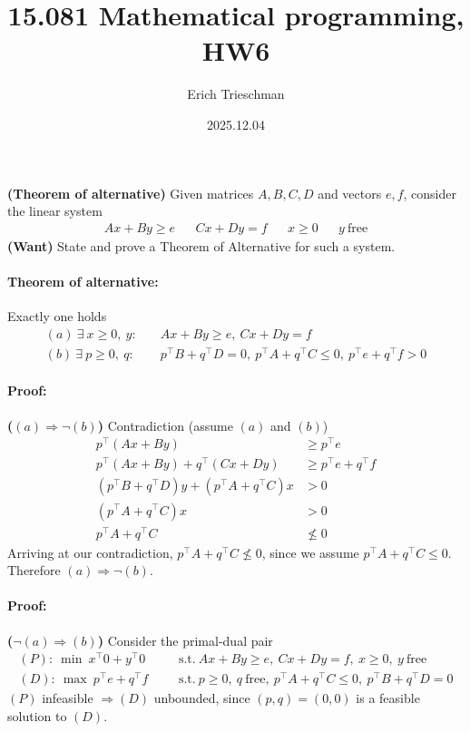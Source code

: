 \documentclass[11pt]{exam}
\title{15.081 Mathematical programming, HW6}
\author{Erich Trieschman}
\date{2025.12.04}
\begin{document}
\maketitle

\begin{questions}
    \question \textbf{(Theorem of alternative)} Given matrices $A,B,C,D$ and vectors $e,f$, consider the linear system
    \begin{align*}
        Ax + By \geq e && Cx + Dy = f && x\geq 0 && y \ \text{free}
    \end{align*}
    \textbf{(Want)} State and prove a Theorem of Alternative for such a system.

    \paragraph{Theorem of alternative:} Exactly one holds
    \begin{align*}
        (a)\ \exists\ x\geq 0,\ y:\quad& Ax + By \geq e,\ Cx + Dy = f\\
        (b)\ \exists\ p\geq0,\ q:\quad& p^\top B + q^\top D = 0,\ p^\top A + q^\top C \leq 0,\ p^\top e + q^\top f > 0
    \end{align*}
    \paragraph{Proof:} \textbf{($(a) \Rightarrow \neg (b)$)} Contradiction (assume $(a)$ and $(b)$)
    \begin{align*}
        p^\top (Ax + By) &\geq p^\top e \tag{$\forall\ p \geq 0$, since $Ax + By \geq e$ from $(a)$}\\
        p^\top (Ax + By) + q^\top (Cx + Dy) &\geq p^\top e + q^\top f \tag{$\forall\ q$, since $Cx + Dy=f$ from $(a)$}\\
        (p^\top B + q^\top D)y + (p^\top A + q^\top C)x &> 0 \tag{since $p^\top e + q^\top f>0$ from $(b)$}\\
        (p^\top A + q^\top C)x &> 0 \tag{since $p^\top B + q^\top D=0$ from $(b)$}\\
        p^\top A + q^\top C &\not\leq 0 \tag{since $x\geq 0$ from $(a)$}
    \end{align*}
    Arriving at our contradiction, $p^\top A + q^\top C \not\leq 0$, since we assume $p^\top A + q^\top C \leq 0$. Therefore $(a) \Rightarrow \neg (b)$.

    \paragraph{Proof:} \textbf{($\neg(a) \Rightarrow (b)$)} Consider the primal-dual pair
    \begin{align*}
        (P):\ \min\ x^\top 0 + y^\top 0 && & \text{s.t.}\ Ax + By \geq e,\ Cx + Dy = f,\ x\geq 0,\ y\ \text{free}\\
        (D):\ \max\ p^\top e + q^\top f && & \text{s.t.}\ p\geq 0,\ q\ \text{free},\ p^\top A + q^\top C \leq 0,\ p^\top B + q^\top D = 0
    \end{align*}
    $(P)$ infeasible $\Longrightarrow (D)$ unbounded, since $(p,q)=(0,0)$ is a feasible solution to $(D)$.
    

\end{questions}
\end{document}
